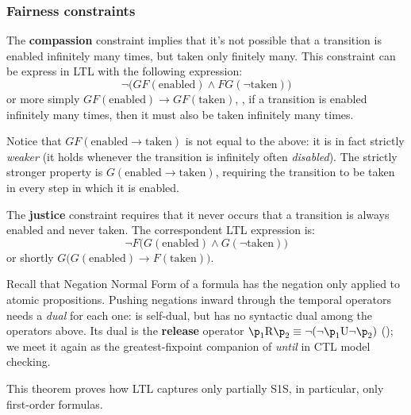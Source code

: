 \documentclass[oneside]{academica}
\begin{document}
\subsubsection{Fairness constraints}

The \textbf{compassion} constraint implies that it's not possible that a transition is enabled infinitely many times, but taken only finitely many.
This constraint can be express in LTL with the following expression:
\begin{equation*}
  \neg\Big( GF(\text{enabled}) \land FG(\neg\text{taken})\Big)
\end{equation*}
or more simply $GF(\text{enabled}) \to GF(\text{taken})$, \ie, if a transition is enabled infinitely many times, then it must also be taken infinitely many times.
\begin{note}
  Notice that $GF(\text{enabled} \to \text{taken})$ is not equal to the above: it is in fact strictly \emph{weaker} (it holds whenever the transition is infinitely often \emph{disabled}). The strictly stronger property is $G(\text{enabled} \to \text{taken})$, requiring the transition to be taken in every step in which it is enabled.
\end{note}

\bigskip
The \textbf{justice} constraint requires that it never occurs that a transition is always enabled and never taken.
The correspondent LTL expression is:
\begin{equation*}
  \neg F \Big( G(\text{enabled}) \land G(\neg\text{taken})\Big)
\end{equation*}
or shortly $G\Big(G(\text{enabled}) \to F(\text{taken})\Big)$.

\bigskip
Recall that Negation Normal Form of a formula has the negation only applied to atomic propositions. Pushing negations inward through the temporal operators needs a \emph{dual} for each one:  is self-dual, but  has no syntactic dual among the operators above. Its dual is the \textbf{release} operator $\p_1 \RRR \p_2 \equiv \neg(\neg\p_1 \UU \neg\p_2)$ (); we meet it again as the greatest-fixpoint companion of \emph{until} in CTL model checking.


This theorem proves how LTL captures only partially S1S, in particular, only first-order formulas.
\end{document}
